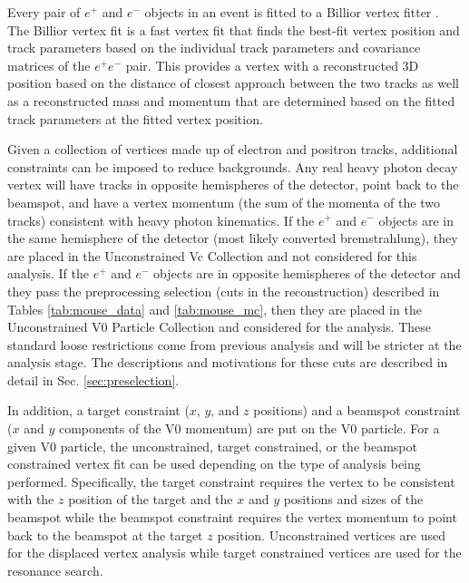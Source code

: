 Every pair of $e^+$ and $e^-$ objects in an event is fitted to a Billior vertex fitter \cite{BILLOIR1992139}. The Billior vertex fit is a fast vertex fit that finds the best-fit vertex position and track parameters based on the individual track parameters and covariance matrices of the $e^+e^-$ pair. This provides a vertex with a reconstructed 3D position based on the distance of closest approach between the two tracks as well as a reconstructed mass and momentum that are determined based on the fitted track parameters at the fitted vertex position. 

Given a collection of vertices made up of electron and positron tracks, additional constraints can be imposed to reduce backgrounds. Any real heavy photon decay vertex will have tracks in opposite hemispheres of the detector, point back to the beamspot, and have a vertex momentum (the sum of the momenta of the two tracks) consistent with heavy photon kinematics. If the $e^+$ and $e^-$ objects are in the same hemisphere of the detector (most likely converted bremstrahlung), they are placed in the Unconstrained Vc Collection and not considered for this analysis. If the $e^+$ and $e^-$ objects are in opposite hemispheres of the detector and they pass the preprocessing selection (cuts in the reconstruction) described in Tables \ref{tab:mouse_data} and \ref{tab:mouse_mc}, then they are placed in the Unconstrained V0 Particle Collection and considered for the analysis. These standard loose restrictions come from previous analysis and will be stricter at the analysis stage. The descriptions and motivations for these cuts are described in detail in Sec. \ref{sec:preselection}.

In addition, a target constraint ($x$, $y$, and $z$ positions) and a beamspot constraint ($x$ and $y$ components of the V0 momentum) are put on the V0 particle. For a given V0 particle, the unconstrained, target constrained, or the beamspot constrained vertex fit can be used depending on the type of analysis being performed. Specifically, the target constraint requires the vertex to be consistent with the $z$ position of the target and the $x$ and $y$ positions and sizes of the beamspot while the beamspot constraint requires the vertex momentum to point back to the beamspot at the target $z$ position. Unconstrained vertices are used for the displaced vertex analysis while target constrained vertices are used for the resonance search. 



